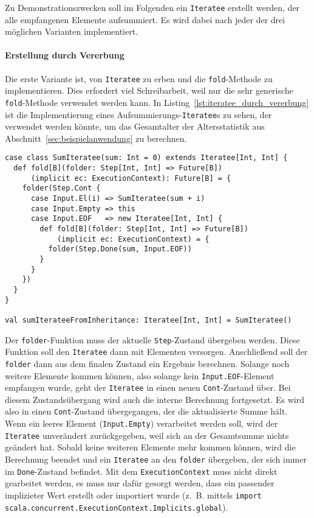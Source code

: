 Zu Demonstrationszwecken soll im Folgenden ein \lstinline|Iteratee| erstellt werden, der alle empfangenen Elemente aufsummiert.
Es wird dabei nach jeder der drei möglichen Varianten implementiert.

\paragraph{Erstellung durch Vererbung} %
\label{par:erstellung_durch_vererbung}\mbox{} %

Die erste Variante ist, von \lstinline|Iteratee| zu erben und die \lstinline|fold|-Methode zu implementieren.
Dies erfordert viel Schreibarbeit, weil nur die sehr generische \lstinline|fold|-Methode verwendet werden kann.
In Listing~\ref{lst:iteratee_durch_vererbung} ist die Implementierung eines Aufsummierungs-\lstinline|Iteratee|s zu sehen, der verwendet werden könnte, um das Gesamtalter der Altersstatistik aus Abschnitt~\ref{sec:beispielanwendung} zu berechnen.

\begin{lstlisting}[caption=Erstellung eines Iteratees durch Vererbung, label=lst:iteratee_durch_vererbung]
case class SumIteratee(sum: Int = 0) extends Iteratee[Int, Int] {
  def fold[B](folder: Step[Int, Int] => Future[B])
      (implicit ec: ExecutionContext): Future[B] = {
    folder(Step.Cont {
      case Input.El(i) => SumIteratee(sum + i)
      case Input.Empty => this
      case Input.EOF   => new Iteratee[Int, Int] {
        def fold[B](folder: Step[Int, Int] => Future[B])
            (implicit ec: ExecutionContext) = {
          folder(Step.Done(sum, Input.EOF))
        }
      }
    })
  }
}

val sumIterateeFromInheritance: Iteratee[Int, Int] = SumIteratee()
\end{lstlisting}

Der \lstinline|folder|-Funktion muss der aktuelle \lstinline|Step|-Zustand übergeben werden.
Diese Funktion soll den \lstinline|Iteratee| dann mit Elementen versorgen.
Anschließend soll der \lstinline|folder| dann aus dem finalen Zustand ein Ergebnis berechnen.
Solange noch weitere Elemente kommen können, also solange kein \lstinline|Input.EOF|-Element empfangen wurde, geht der \lstinline|Iteratee| in einen neuen \lstinline|Cont|-Zustand über.
Bei diesem Zustandsübergang wird auch die interne Berechnung fortgesetzt.
Es wird also in einen \lstinline|Cont|-Zustand übergegangen, der die aktualisierte Summe hält.
Wenn ein leeres Element (\lstinline|Input.Empty|) verarbeitet werden soll, wird der \lstinline|Iteratee| unverändert zurückgegeben, weil sich an der Gesamtsumme nichts geändert hat.
Sobald keine weiteren Elemente mehr kommen können, wird die Berechnung beendet und ein \lstinline|Iteratee| an den \lstinline|folder| übergeben, der sich immer im \lstinline|Done|-Zustand befindet.
Mit dem \lstinline|ExecutionContext| muss nicht direkt gearbeitet werden, es muss nur dafür gesorgt werden, dass ein passender implizieter Wert erstellt oder importiert wurde (z.~B. mittels \lstinline|import scala.concurrent.ExecutionContext.Implicits.global|).

